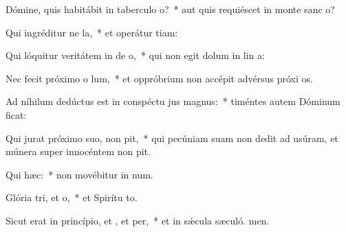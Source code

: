 \item Dómine, quis habitábit in taberculo o?~* aut quis requiéscet in monte sanc o?
\item Qui ingréditur ne la,~* et operátur tiam:
\item Qui lóquitur veritátem in de o,~* qui non egit dolum in lin a:
\item Nec fecit próximo o lum,~* et oppróbrium non accépit advérsus próxi os.
\item Ad níhilum dedúctus est in conspéctu jus magnus:~* timéntes autem Dóminum ficat:
\item Qui jurat próximo suo,  non pit,~* qui pecúniam suam non dedit ad usúram, et múnera super innocéntem non pit.
\item Qui  hæc:~* non movébitur in num.
\item Glória tri, et o,~* et Spirítu to.
\item Sicut erat in princípio, et , et per,~* et in sǽcula sæculó. men.
